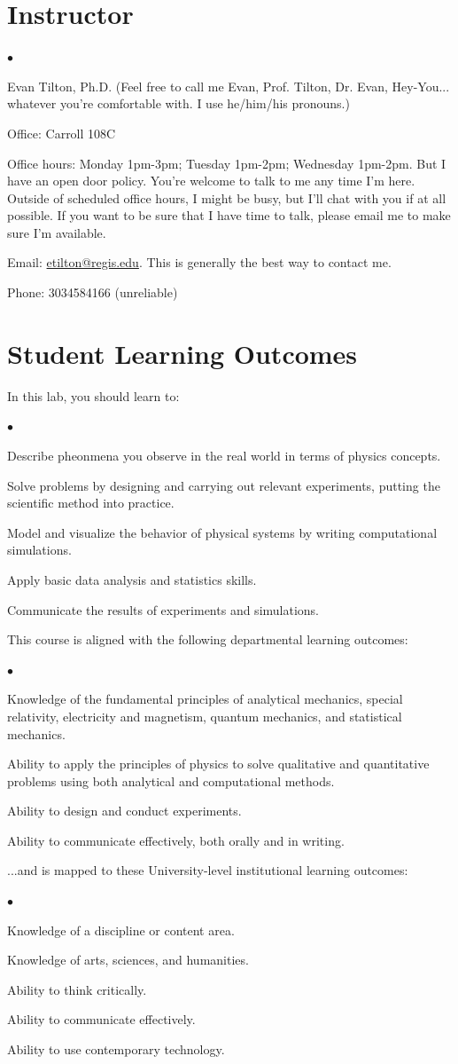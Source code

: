 \documentclass[11pt]{article}
\newcommand{\squishlist}{
   \begin{list}{$\bullet$}
    { \setlength{\itemsep}{0pt}      \setlength{\parsep}{3pt}
      \setlength{\topsep}{3pt}       \setlength{\partopsep}{0pt}
      \setlength{\leftmargin}{1.5em} \setlength{\labelwidth}{1em}
      \setlength{\labelsep}{0.5em} } }
\newcommand{\squishend}{
    \end{list}  }
\begin{document}
\section{Instructor}
\squishlist
\item Evan Tilton, Ph.D. (Feel free to call me Evan, Prof. Tilton, Dr. Evan, Hey-You... whatever you're comfortable with. I use he/him/his pronouns.)
\item Office: Carroll 108C
\item Office hours: Monday 1pm-3pm; Tuesday 1pm-2pm; Wednesday 1pm-2pm. But I have an open door policy. You're welcome to talk to me any time I'm here. Outside of scheduled office hours, I might be busy, but I'll chat with you if at all possible. If you want to be sure that I have time to talk, please email me to make sure I'm available.
\item  Email: \url{etilton@regis.edu}.  This is generally the best way to contact me.
\item Phone: 3034584166 (unreliable)
\squishend

\section{Student Learning Outcomes}

In this lab, you should learn to:
\squishlist
\item Describe pheonmena you observe in the real world in terms of physics concepts.
\item Solve problems by designing and carrying out relevant experiments, putting the scientific method into practice.
\item Model and visualize the behavior of physical systems by writing computational simulations.
\item Apply basic data analysis and statistics skills.
\item Communicate the results of experiments and simulations.
\squishend
This course is aligned with the following departmental learning outcomes:
\squishlist
\item Knowledge of the fundamental principles of analytical mechanics, special relativity, electricity and magnetism, quantum mechanics, and statistical mechanics.
\item Ability to apply the principles of physics to solve qualitative and quantitative problems using both analytical and computational methods.
\item Ability to design and conduct experiments.
\item Ability to communicate effectively, both orally and in writing.
\squishend
...and is mapped to these University-level institutional learning outcomes:
\squishlist
\item Knowledge of a discipline or content area.
\item Knowledge of arts, sciences, and humanities.
\item Ability to think critically.
\item Ability to communicate effectively.
\item Ability to use contemporary technology.
\squishend
\end{document}
